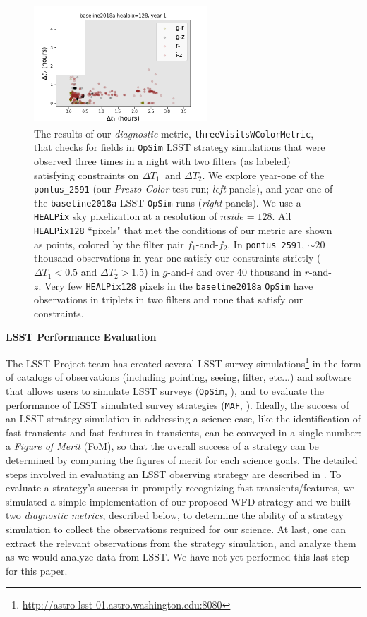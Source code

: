 \documentclass[letterpaper,longauthor,trackchanges,twocolumn,onecolappendix,sort&compress]{aastex62}
\newcommand{\dtone}{\ensuremath{\Delta T_1}}
\newcommand{\dttwo}{\ensuremath{\Delta T_2}}
\begin{document}
\begin{figure}[!t]
\begin{center}
\includegraphics[width=6.5cm,height=4.5cm]{figures/3visits_baseline2018a_grgzriiz.png}
\caption{{The results of our {\em diagnostic} metric, {\tt threeVisitsWColorMetric}, that checks for fields in {\tt OpSim} LSST strategy simulations that were observed three times in a night with two filters (as labeled) satisfying  constraints on \dtone\ and \dttwo. We explore year-one of the {\tt pontus\_2591} (our {\em Presto-Color} test run; \emph{left} panels), and year-one of the {\tt baseline2018a} LSST {\tt OpSim} runs (\emph{right} panels). We use a {\tt HEALPix} \citep{Gorski05} sky pixelization at a resolution of $nside=128$. All {\tt HEALPix128} ``pixels" that met the conditions of our metric are shown as points, colored by the filter pair $f_1$-and-$f_2$. 
In {\tt pontus\_2591}, $\sim20$ thousand observations in year-one satisfy our constraints strictly ($\dtone<0.5$ and $\dttwo>1.5$) in $g$-and-$i$ and over 40 thousand in $r$-and-$z$.
Very few {\tt HEALPix128} pixels in the {\tt baseline2018a} {\tt OpSim} have observations in triplets in two filters and none that satisfy our constraints.}}\label{fig:metricresult}
\end{center}
\end{figure}

\appendix 

{\bf LSST Performance Evaluation}


The LSST Project team has created several LSST survey simulations\footnote{\url{http://astro-lsst-01.astro.washington.edu:8080}} in the form of catalogs of observations (including pointing, seeing, filter, etc...) and software that allows users to simulate LSST surveys ({\tt OpSim}, \citealt{opsim}), and to evaluate the performance of LSST simulated survey strategies ({\tt MAF}, \citealt{maf}). Ideally, the success of an LSST strategy simulation in addressing a science case, like the identification of fast transients and fast features in transients, can be conveyed in a single number: a \emph{Figure of Merit} (FoM), so that the overall success of a strategy can be determined by comparing the figures of merit for each science goals. %
The detailed steps involved in evaluating an LSST observing strategy are described in \citet{COSEP}. 
To evaluate a strategy's success in promptly recognizing fast transients/features, we simulated a simple implementation of our proposed WFD strategy and we built two \emph{diagnostic metrics}, described below, to determine the ability of a strategy simulation to collect the observations required for our science. At last, one can extract the relevant observations from the strategy simulation, and analyze them as we would analyze data from LSST. We have not yet performed this last step for this paper.
\end{document}
